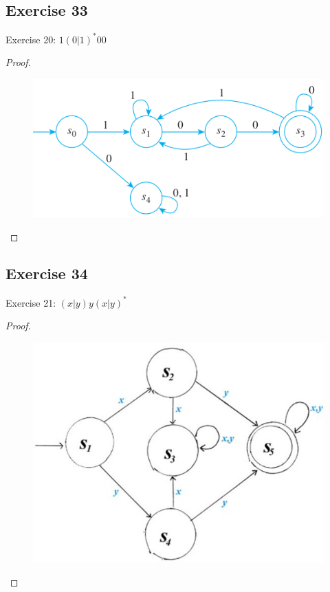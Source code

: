 \documentclass[14pt]{extarticle}
\begin{document}
\subsection{Exercise 33}
Exercise 20: \(1(0 | 1)^* 00\)
\begin{proof}
\begin{figure}[ht!]
\centering
\includegraphics[scale=0.5]{../images/12.2.33.png}
\end{figure}
\end{proof}

\subsection{Exercise 34}
Exercise 21: \((x | y)y(x | y)^*\)
\begin{proof}
\begin{figure}[ht!]
\centering
\includegraphics[scale=0.2]{../images/12.2.34.png}
\end{figure}
\end{proof}
\end{document}
